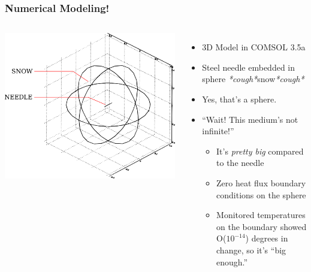 \documentclass{beamer}
\begin{document}
\begin{frame}
\frametitle{Numerical Modeling!}
\begin{columns}[c]
    \includegraphics[width=\textwidth]{fig/domain.png}
    \begin{itemize}
    \item 3D Model in COMSOL 3.5a
    \item Steel needle embedded in sphere \emph{*cough*}snow\emph{*cough*}
    \item Yes, that's a sphere.
    \item ``Wait! This medium's not infinite!'' \begin{itemize}
        \item It's \emph{pretty big} compared to the needle
        \item Zero heat flux boundary conditions on the sphere
        \item Monitored temperatures on the boundary showed O(\(10^{-14}\)) degrees in change, so it's ``big enough.''
        \end{itemize}
    \end{itemize}
\end{columns}
\end{frame}
\end{document}
